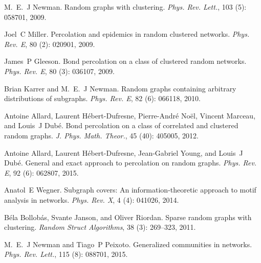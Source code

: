 M.~E.~J Newman.
\newblock Random graphs with clustering.
\newblock \emph{Phys. Rev. Lett.}, 103 (5): 058701, 2009.

Joel~C Miller.
\newblock Percolation and epidemics in random clustered networks.
\newblock \emph{Phys. Rev. E}, 80 (2): 020901,
2009{}.

James~P Gleeson.
\newblock Bond percolation on a class of clustered random networks.
\newblock \emph{Phys. Rev. E}, 80 (3): 036107, 2009.

Brian Karrer and M.~E.~J Newman.
\newblock Random graphs containing arbitrary distributions of subgraphs.
\newblock \emph{Phys. Rev. E}, 82 (6): 066118, 2010.

Antoine Allard, Laurent {H{\'e}bert-Dufresne}, Pierre-Andr{\'e} No{\"e}l,
Vincent Marceau, and Louis~J Dub{\'e}.
\newblock Bond percolation on a class of correlated and clustered random
graphs.
\newblock \emph{J. Phys. Math. Theor.}, 45 (40): 405005,
2012.

Antoine Allard, Laurent {H{\'e}bert-Dufresne}, Jean-Gabriel Young, and Louis~J
Dub{\'e}.
\newblock General and exact approach to percolation on random graphs.
\newblock \emph{Phys. Rev. E}, 92 (6): 062807, 2015.

Anatol~E Wegner.
\newblock Subgraph covers: An information-theoretic approach to motif analysis
in networks.
\newblock \emph{Phys. Rev. X}, 4 (4): 041026, 2014.

B{\'e}la Bollob{\'a}s, Svante Janson, and Oliver Riordan.
\newblock Sparse random graphs with clustering.
\newblock \emph{Random Struct Algorithms}, 38 (3): 269--323,
2011.

M.~E.~J Newman and Tiago~P Peixoto.
\newblock Generalized communities in networks.
\newblock \emph{Phys. Rev. Lett.}, 115 (8): 088701, 2015.

